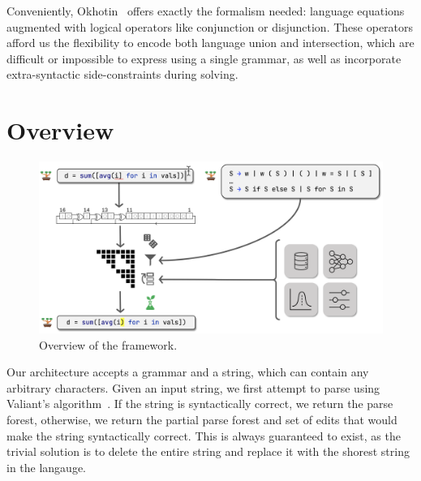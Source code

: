 \documentclass[sigplan,review,anonymous,acmsmall]{acmart}\settopmatter{printfolios=false,printccs=false,printacmref=false}
\begin{document}
Conveniently, Okhotin~\cite{okhotin2010decision} offers exactly the formalism needed: language equations augmented with logical operators like conjunction or disjunction. These operators afford us the flexibility to encode both language union and intersection, which are difficult or impossible to express using a single grammar, as well as incorporate extra-syntactic side-constraints during solving.


\section{Overview}

\begin{figure}[t]
  \centering
  \includegraphics[width=0.9\linewidth]{../figures/architecture_overview.png}
  \caption{Overview of the framework.}
  \label{fig:overview}
\end{figure}

Our architecture accepts a grammar and a string, which can contain any arbitrary characters. Given an input string, we first attempt to parse using Valiant's algorithm~\cite{valiant1979completeness}. If the string is syntactically correct, we return the parse forest, otherwise, we return the partial parse forest and set of edits that would make the string syntactically correct. This is always guaranteed to exist, as the trivial solution is to delete the entire string and replace it with the shorest string in the langauge.
\end{document}
